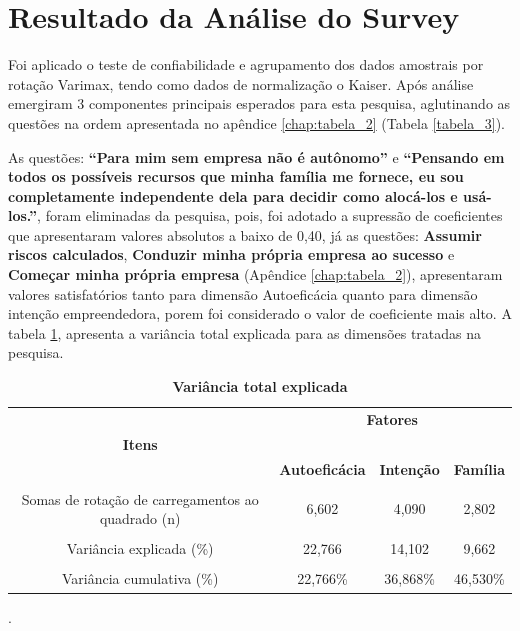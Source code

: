 \section{Resultado da Análise do Survey}

Foi aplicado o teste de confiabilidade e agrupamento dos dados amostrais por rotação Varimax, tendo como dados de normalização o Kaiser\footnotemark[1]. 
Após análise  emergiram 3 componentes principais esperados para esta pesquisa, aglutinando as questões na ordem apresentada no apêndice \ref{chap:tabela_2} (Tabela \ref{tabela_3}).


As questões: \textbf{“Para mim sem empresa não é autônomo”} e \textbf{“Pensando em todos os possíveis recursos que minha família me fornece, eu sou completamente independente dela para decidir como alocá-los e usá-los.”}, foram eliminadas da pesquisa, pois, foi adotado a supressão de coeficientes que apresentaram valores absolutos a baixo de 0,40, já as questões: \textbf{Assumir riscos calculados}, \textbf{Conduzir minha própria empresa ao sucesso} e \textbf{Começar minha própria empresa} (Apêndice \ref{chap:tabela_2}), apresentaram valores satisfatórios tanto para dimensão Autoeficácia quanto para dimensão intenção empreendedora, porem foi considerado o valor de coeficiente mais alto. A tabela \ref{tab:tabela_4}, apresenta a variância total explicada para as dimensões tratadas na pesquisa.

\begin{table}[H]
 \centering
\caption{\textbf{Variância total explicada}}
\label{tab:tabela_4}
\hline\hline
\begin{tabular}{c c c c }
\multicolumn{1}{p{6cm}}{} & \multicolumn{3}{c}{\textbf{Fatores}}\\ 
 \multicolumn{1}{c}{\textbf{Itens}} & \multicolumn{3}{c}{\hrulefill}\\ 

 \multicolumn{1}{c}{} 
 &\multicolumn{1}{c}{\textbf{Autoeficácia}} & \multicolumn{1}{c}{\textbf{Intenção}} &\multicolumn{1}{c}{\textbf{Família}}  
\\\\ \hline 

 Somas de rotação de carregamentos ao quadrado (n)
 & 6,602 & 4,090 & 2,802 \\\\
 Variância explicada (\%)
 & 22,766 & 14,102 & 9,662\\\\
 Variância cumulativa (\%)
 & 22,766\% & 36,868\% & 46,530\% \\\hline \hline 
\end{tabular}
.
\end{table}


